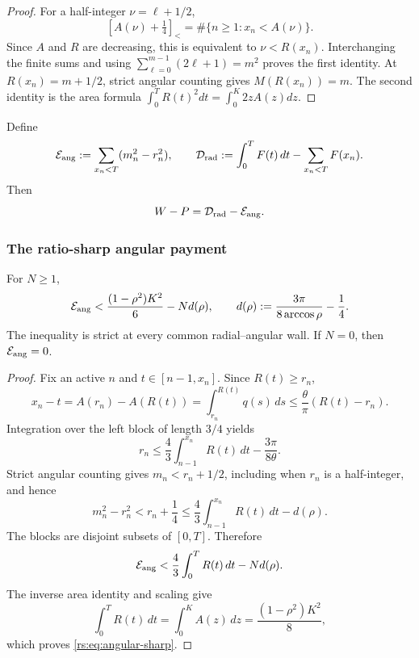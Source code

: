 \begin{proof}
For a half-integer $\nu=\ell+1/2$,
\[
 [A(\nu)+\tfrac14]_<
 =\#\{n\geq1:x_n<A(\nu)\}.
\]
Since $A$ and $R$ are decreasing, this is equivalent to
$\nu<R(x_n)$.  Interchanging the finite sums and using
$\sum_{\ell=0}^{m-1}(2\ell+1)=m^2$ proves the first identity.  At
$R(x_n)=m+1/2$, strict angular counting gives $M(R(x_n))=m$.
The second identity is the area formula
$\int_0^TR(t)^2dt=\int_0^K2zA(z)dz$.
\end{proof}

Define
\begin{equation}
 \mathcal E_{\rm ang}:=\sum_{x_n<T}(m_n^2-r_n^2),
 \qquad
 \mathcal D_{\rm rad}:=\int_0^TF(t)\,dt-\sum_{x_n<T}F(x_n).
 \label{rs:eq:defects}
\end{equation}
Then
\begin{equation}
 W-P=\mathcal D_{\rm rad}-\mathcal E_{\rm ang}.
 \label{rs:eq:master-defect}
\end{equation}

\subsubsection*{The ratio-sharp angular payment}

\begin{proposition}
\label{rs:prop:angular}
For $N\geq1$,
\begin{equation}
 \mathcal E_{\rm ang}
 <\frac{(1-\rho^2)K^2}{6}-N d(\rho),
 \qquad
 d(\rho):=\frac{3\pi}{8\arccos\rho}-\frac14.
 \label{rs:eq:angular-sharp}
\end{equation}
The inequality is strict at every common radial--angular wall.  If $N=0$,
then $\mathcal E_{\rm ang}=0$.
\end{proposition}

\begin{proof}
Fix an active $n$ and $t\in[n-1,x_n]$.  Since $R(t)\geq r_n$,
\[
 x_n-t=A(r_n)-A(R(t))
 =\int_{r_n}^{R(t)}q(s)\,ds
 \leq\frac{\theta}{\pi}(R(t)-r_n).
\]
Integration over the left block of length $3/4$ yields
\begin{equation}
 r_n\leq\frac43\int_{n-1}^{x_n}R(t)\,dt
       -\frac{3\pi}{8\theta}.
 \label{rs:eq:rn-block}
\end{equation}
Strict angular counting gives $m_n<r_n+1/2$, including when $r_n$ is a
half-integer, and hence
\begin{equation}
 m_n^2-r_n^2<r_n+\frac14
 \leq\frac43\int_{n-1}^{x_n}R(t)\,dt-d(\rho).
 \label{rs:eq:one-angular-block}
\end{equation}
The blocks are disjoint subsets of $[0,T]$.  Therefore
\[
 \mathcal E_{\rm ang}
 <\frac43\int_0^TR(t)\,dt-Nd(\rho).
\]
The inverse area identity and scaling give
\[
 \int_0^TR(t)\,dt=\int_0^KA(z)\,dz
 =\frac{(1-\rho^2)K^2}{8},
\]
which proves \eqref{rs:eq:angular-sharp}.
\end{proof}

